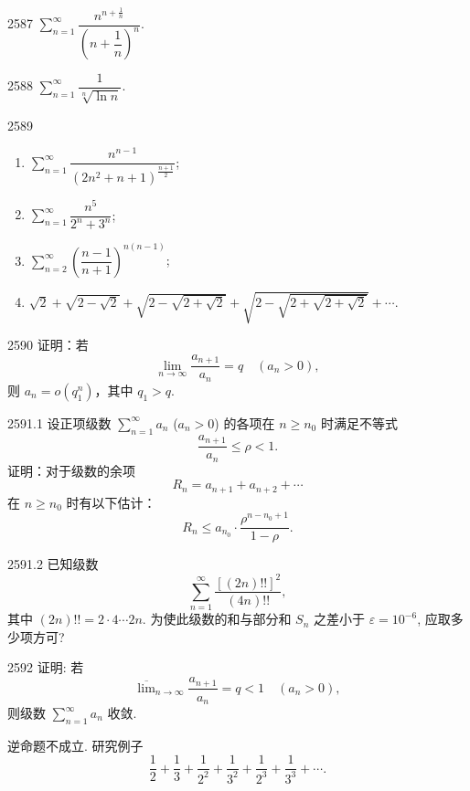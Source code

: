 \begin{prob}[S]{2587}
$\sum_{n=1}^{\infty} \dfrac{n^{n + \frac{1}{n}}}{\left(n + \dfrac{1}{n}\right)^n}$.
\end{prob}

\begin{prob}[S]{2588}
$\sum_{n=1}^{\infty} \dfrac{1}{\sqrt[n]{\ln n}}$.
\end{prob}

\begin{prob}[L]{2589}
\begin{enumerate}[label=(\alph*), itemsep=2pt, topsep=3pt]
  \item $\sum_{n=1}^{\infty} \dfrac{n^{n-1}}{(2n^2 + n + 1)^{\frac{n+1}{2}}}$;
  \item $\sum_{n=1}^{\infty} \dfrac{n^5}{2^n + 3^n}$;
  \item $\sum_{n=2}^{\infty} \left(\dfrac{n - 1}{n + 1}\right)^{n(n-1)}$;
  \item $\sqrt{2} + \sqrt{2 - \sqrt{2}} + \sqrt{2 - \sqrt{2 + \sqrt{2}}} + \sqrt{2 - \sqrt{2 + \sqrt{2 + \sqrt{2}}}} + \cdots$.
\end{enumerate}
\end{prob}

\begin{prob}[M]{2590}
证明：若
\[
\lim_{n \to \infty} \frac{a_{n+1}}{a_n} = q \quad (a_n > 0),
\]
则 $a_n = o(q_1^n)$，其中 $q_1 > q$.
\end{prob}

\begin{prob}[M]{2591.1}
设正项级数 $\sum_{n=1}^{\infty} a_n$ ($a_n > 0$) 的各项在 $n \geqslant n_0$ 时满足不等式
\[
\frac{a_{n+1}}{a_n} \leqslant \rho < 1.
\]
证明：对于级数的余项
\[
R_n = a_{n+1} + a_{n+2} + \cdots
\]
在 $n \geqslant n_0$ 时有以下估计：
\[
R_n \leqslant a_{n_0} \cdot \frac{\rho^{n - n_0 + 1}}{1 - \rho}.
\]
\end{prob}

\begin{prob}[M]{2591.2}
已知级数
\[
\sum_{n=1}^{\infty} \frac{[(2n)!!]^2}{(4n)!!},
\]
其中 $(2n)!! = 2 \cdot 4 \cdots 2n$. 为使此级数的和与部分和 $S_n$ 之差小于 $\varepsilon = 10^{-6}$, 应取多少项方可?
\end{prob}

\begin{prob}[M]{2592}
证明: 若
\[
\overline{\lim}_{n\to\infty} \frac{a_{n+1}}{a_n} = q < 1 \quad (a_n > 0),
\]
则级数 $\sum_{n=1}^{\infty} a_n$ 收敛.

逆命题不成立. 研究例子
\[
\frac{1}{2} + \frac{1}{3} + \frac{1}{2^2} + \frac{1}{3^2} + \frac{1}{2^3} + \frac{1}{3^3} + \cdots.
\]
\end{prob}

